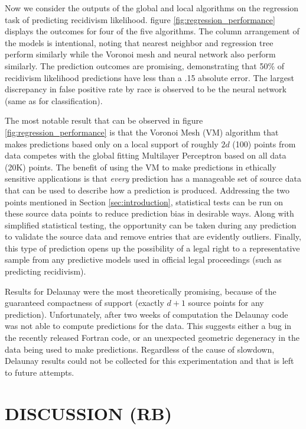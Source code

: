 \documentclass[sigconf]{acmart}
\newcommand{\thomastilde}{\raisebox{0.1ex}{\texttildelow}}
\begin{document}
Now we consider the outputs of the global and local algorithms on the regression task of predicting recidivism likelihood. figure \ref{fig:regression_performance} displays the outcomes for four of the five algorithms. The column arrangement of the models is intentional, noting that nearest neighbor and regression tree perform similarly while the Voronoi mesh and neural network also perform similarly. The prediction outcomes are promising, demonstrating that 50\% of recidivism likelihood predictions have less than a .15 absolute error. The largest discrepancy in false positive rate by race is observed to be the neural network (same as for classification).

The most notable result that can be observed in figure \ref{fig:regression_performance} is that the Voronoi Mesh (VM) algorithm that makes predictions based only on a local support of roughly $2d$ (\thomastilde{}100) points from data competes with the global fitting Multilayer Perceptron based on all data (\thomastilde{}20K) points. The benefit of using the VM to make predictions in ethically sensitive applications is that \textit{every} prediction has a manageable set of source data that can be used to describe how a prediction is produced. Addressing the two points mentioned in Section \ref{sec:introduction}, statistical tests can be run on these source data points to reduce prediction bias in desirable ways. Along with simplified statistical testing, the opportunity can be taken during any prediction to validate the source data and remove entries that are evidently outliers. Finally, this type of prediction opens up the possibility of a legal right to a representative sample from any predictive models used in official legal proceedings (such as predicting recidivism).

Results for Delaunay were the most theoretically promising, because of the guaranteed compactness of support (exactly $d+1$ source points for any prediction). Unfortunately, after two weeks of computation the Delaunay code was not able to compute predictions for the data. This suggests either a bug in the recently released Fortran code, or an unexpected geometric degeneracy in the data being used to make predictions. Regardless of the cause of slowdown, Delaunay results could not be collected for this experimentation and that is left to future attempts.


\section{DISCUSSION (RB)}
\label{sec:discussion}
\end{document}

